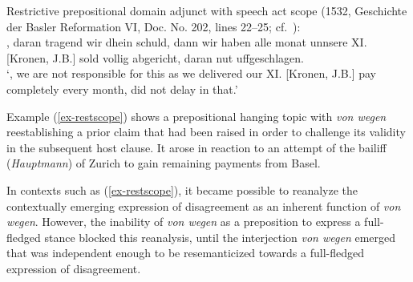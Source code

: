 \documentclass[output=paper
  ,nobabel
  ,draftmode
  ,babelshorthands
  ,colorlinks, citecolor=brown
]{langscibook}
\begin{document}
\ea\label{ex-restscope} Restrictive prepositional domain adjunct with speech act scope (1532, Geschichte der Basler Reformation VI, Doc. No. 202, lines 22--25; cf.\ \citealp[161]{Roth1950}):\\
, daran tragend wir dhein schuld, dann wir haben alle monat unnsere XI. [Kronen, J.B.] sold vollig abgericht, daran nut uffgeschlagen.\\
`, we are not responsible for this as we delivered our XI. [Kronen, J.B.] pay completely every month, did not delay in that.'
\z

\noindent
Example (\ref{ex-restscope}) shows a prepositional hanging topic with \emph{von wegen} reestablishing a prior claim that had been raised in order to challenge its validity in the subsequent host clause. It arose in reaction to an attempt of the bailiff (\emph{Hauptmann}) of Zurich to gain remaining payments from Basel.

\largerpage
In contexts such as (\ref{ex-restscope}), it became possible to reanalyze the contextually emerging expression of disagreement as an inherent function of \emph{von wegen}. However, the inability of \emph{von wegen} as a preposition to express a full-fledged stance blocked this reanalysis, until the interjection \emph{von wegen} emerged that was independent enough to be resemanticized towards a full-fledged expression of disagreement.
\end{document}
